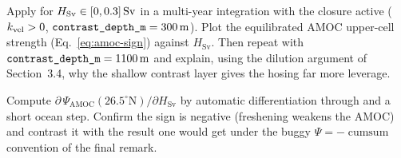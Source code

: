 \begin{exercise}
Apply  for $H_{\mathrm{Sv}}\in[0,0.3]\,\mathrm{Sv}$
in a multi-year integration with the closure active ($k_{\mathrm{vel}}>0$,
$\texttt{contrast\_depth\_m}=300\,\mathrm{m}$). Plot the equilibrated AMOC upper-cell
strength (Eq.~\ref{eq:amoc-sign}) against $H_{\mathrm{Sv}}$. Then repeat with
$\texttt{contrast\_depth\_m}=1100\,\mathrm{m}$ and explain, using the dilution
argument of Section~3.4, why the shallow contrast layer gives the hosing far more
leverage.
\end{exercise}

\begin{exercise}
Compute $\partial\,\Psi_{\mathrm{AMOC}}(26.5^{\circ}\mathrm{N})/\partial H_{\mathrm{Sv}}$
by automatic differentiation through  and a
short ocean step. Confirm the sign is negative (freshening weakens the AMOC) and
contrast it with the result one would get under the buggy $\Psi=-\!\operatorname{cumsum}$
convention of the final remark.
\end{exercise}
